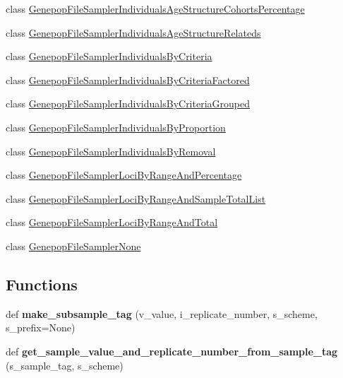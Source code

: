 \begin{DoxyCompactItemize}
class \hyperlink{classnegui_1_1genepopfilesampler_1_1GenepopFileSamplerIndividualsAgeStructureCohortsPercentage}{Genepop\+File\+Sampler\+Individuals\+Age\+Structure\+Cohorts\+Percentage}
\item 
class \hyperlink{classnegui_1_1genepopfilesampler_1_1GenepopFileSamplerIndividualsAgeStructureRelateds}{Genepop\+File\+Sampler\+Individuals\+Age\+Structure\+Relateds}
\item 
class \hyperlink{classnegui_1_1genepopfilesampler_1_1GenepopFileSamplerIndividualsByCriteria}{Genepop\+File\+Sampler\+Individuals\+By\+Criteria}
\item 
class \hyperlink{classnegui_1_1genepopfilesampler_1_1GenepopFileSamplerIndividualsByCriteriaFactored}{Genepop\+File\+Sampler\+Individuals\+By\+Criteria\+Factored}
\item 
class \hyperlink{classnegui_1_1genepopfilesampler_1_1GenepopFileSamplerIndividualsByCriteriaGrouped}{Genepop\+File\+Sampler\+Individuals\+By\+Criteria\+Grouped}
\item 
class \hyperlink{classnegui_1_1genepopfilesampler_1_1GenepopFileSamplerIndividualsByProportion}{Genepop\+File\+Sampler\+Individuals\+By\+Proportion}
\item 
class \hyperlink{classnegui_1_1genepopfilesampler_1_1GenepopFileSamplerIndividualsByRemoval}{Genepop\+File\+Sampler\+Individuals\+By\+Removal}
\item 
class \hyperlink{classnegui_1_1genepopfilesampler_1_1GenepopFileSamplerLociByRangeAndPercentage}{Genepop\+File\+Sampler\+Loci\+By\+Range\+And\+Percentage}
\item 
class \hyperlink{classnegui_1_1genepopfilesampler_1_1GenepopFileSamplerLociByRangeAndSampleTotalList}{Genepop\+File\+Sampler\+Loci\+By\+Range\+And\+Sample\+Total\+List}
\item 
class \hyperlink{classnegui_1_1genepopfilesampler_1_1GenepopFileSamplerLociByRangeAndTotal}{Genepop\+File\+Sampler\+Loci\+By\+Range\+And\+Total}
\item 
class \hyperlink{classnegui_1_1genepopfilesampler_1_1GenepopFileSamplerNone}{Genepop\+File\+Sampler\+None}
\end{DoxyCompactItemize}
\subsection*{Functions}
\begin{DoxyCompactItemize}
\item 
def {\bfseries make\+\_\+subsample\+\_\+tag} (v\+\_\+value, i\+\_\+replicate\+\_\+number, s\+\_\+scheme, s\+\_\+prefix=None)\hypertarget{namespacenegui_1_1genepopfilesampler_a64afa11c4c2d928a96377cdf3d610012}{}\label{namespacenegui_1_1genepopfilesampler_a64afa11c4c2d928a96377cdf3d610012}

\item 
def {\bfseries get\+\_\+sample\+\_\+value\+\_\+and\+\_\+replicate\+\_\+number\+\_\+from\+\_\+sample\+\_\+tag} (s\+\_\+sample\+\_\+tag, s\+\_\+scheme)\hypertarget{namespacenegui_1_1genepopfilesampler_add6542ca0344658bb772d671ef34d761}{}\label{namespacenegui_1_1genepopfilesampler_add6542ca0344658bb772d671ef34d761}

\end{DoxyCompactItemize}
